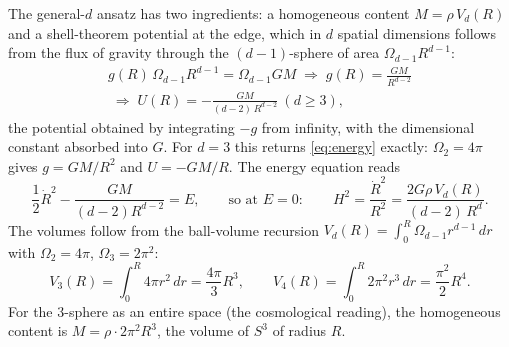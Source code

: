 \documentclass[11pt]{amsbook}
\theoremstyle{plain}
\theoremstyle{definition}
\theoremstyle{remark}
\begin{document}
The general-$d$ ansatz has two ingredients: a homogeneous content $M = \rho\, V_{d}(R)$ and a shell-theorem potential at the edge, which in $d$ spatial dimensions follows from the flux of gravity through the $(d-1)$-sphere of area $\Omega_{d-1} R^{d-1}$:
\begin{equation}\label{eq:d-dim}
\begin{gathered}
g(R)\,\Omega_{d-1} R^{d-1} = \Omega_{d-1} G M
\;\Longrightarrow\;
g(R) = \frac{G M}{R^{d-2}}\\
\;\Longrightarrow\;
U(R) = -\frac{G M}{(d-2)\,R^{d-2}}\ (d \geq 3),
\end{gathered}
\end{equation}
the potential obtained by integrating $-g$ from infinity, with the dimensional constant absorbed into $G$. For $d = 3$ this returns \cref{eq:energy} exactly: $\Omega_{2} = 4\pi$ gives $g = GM/R^{2}$ and $U = -GM/R$. The energy equation reads
\begin{equation}\label{eq:energy-d}
\frac{1}{2}\dot R^{2} - \frac{G M}{(d-2) R^{d-2}} = E,
\qquad\text{so at } E = 0:\qquad
H^{2} = \frac{\dot R^{2}}{R^{2}} = \frac{2 G \rho\, V_{d}(R)}{(d-2)\,R^{d}}.
\end{equation}
The volumes follow from the ball-volume recursion $V_{d}(R) = \int_{0}^{R} \Omega_{d-1} r^{d-1}\,dr$ with $\Omega_{2} = 4\pi$, $\Omega_{3} = 2\pi^{2}$:
\begin{equation}\label{eq:volumes}
V_{3}(R) = \int_{0}^{R} 4\pi r^{2}\,dr = \frac{4\pi}{3}R^{3},
\qquad
V_{4}(R) = \int_{0}^{R} 2\pi^{2} r^{3}\,dr = \frac{\pi^{2}}{2}R^{4}.
\end{equation}
For the $3$-sphere as an entire space (the cosmological reading), the homogeneous content is $M = \rho \cdot 2\pi^{2} R^{3}$, the volume of $S^{3}$ of radius $R$.
\end{document}

